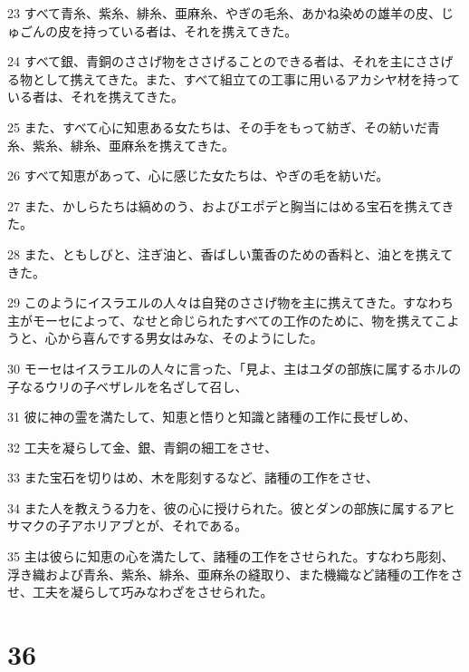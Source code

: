\par 23 すべて青糸、紫糸、緋糸、亜麻糸、やぎの毛糸、あかね染めの雄羊の皮、じゅごんの皮を持っている者は、それを携えてきた。
\par 24 すべて銀、青銅のささげ物をささげることのできる者は、それを主にささげる物として携えてきた。また、すべて組立ての工事に用いるアカシヤ材を持っている者は、それを携えてきた。
\par 25 また、すべて心に知恵ある女たちは、その手をもって紡ぎ、その紡いだ青糸、紫糸、緋糸、亜麻糸を携えてきた。
\par 26 すべて知恵があって、心に感じた女たちは、やぎの毛を紡いだ。
\par 27 また、かしらたちは縞めのう、およびエポデと胸当にはめる宝石を携えてきた。
\par 28 また、ともしびと、注ぎ油と、香ばしい薫香のための香料と、油とを携えてきた。
\par 29 このようにイスラエルの人々は自発のささげ物を主に携えてきた。すなわち主がモーセによって、なせと命じられたすべての工作のために、物を携えてこようと、心から喜んでする男女はみな、そのようにした。
\par 30 モーセはイスラエルの人々に言った、「見よ、主はユダの部族に属するホルの子なるウリの子ベザレルを名ざして召し、
\par 31 彼に神の霊を満たして、知恵と悟りと知識と諸種の工作に長ぜしめ、
\par 32 工夫を凝らして金、銀、青銅の細工をさせ、
\par 33 また宝石を切りはめ、木を彫刻するなど、諸種の工作をさせ、
\par 34 また人を教えうる力を、彼の心に授けられた。彼とダンの部族に属するアヒサマクの子アホリアブとが、それである。
\par 35 主は彼らに知恵の心を満たして、諸種の工作をさせられた。すなわち彫刻、浮き織および青糸、紫糸、緋糸、亜麻糸の縫取り、また機織など諸種の工作をさせ、工夫を凝らして巧みなわざをさせられた。

\chapter{36}

